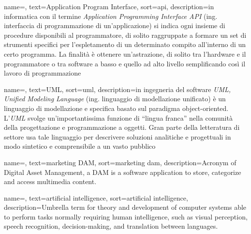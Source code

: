 
\renewcommand{\acronymname}{Acronimi e abbreviazioni}







{
    name=,
    text=Application Program Interface,
    sort=api,
    description={in informatica con il termine \emph{Application Programming Interface API} (ing. interfaccia di programmazione di un'applicazione) si indica ogni insieme di procedure disponibili al programmatore, di solito raggruppate a formare un set di strumenti specifici per l'espletamento di un determinato compito all'interno di un certo programma. La finalità è ottenere un'astrazione, di solito tra l'hardware e il programmatore o tra software a basso e quello ad alto livello semplificando così il lavoro di programmazione}
}

{
    name=,
    text=UML,
    sort=uml,
    description={in ingegneria del software \emph{UML, Unified Modeling Language} (ing. linguaggio di modellazione unificato) è un linguaggio di modellazione e specifica basato sul paradigma object-oriented. L'\emph{UML} svolge un'importantissima funzione di ``lingua franca'' nella comunità della progettazione e programmazione a oggetti. Gran parte della letteratura di settore usa tale linguaggio per descrivere soluzioni analitiche e progettuali in modo sintetico e comprensibile a un vasto pubblico}
}

{
	name=,
	text=marketing DAM,
	sort=marketing dam,
	description={Acronym of Digital Asset Management, a DAM is a software application to store, categorize and access multimedia content.}
}

{
	name=,
	text=artificial intelligence,
	sort=artificial intelligence,
	description={Umbrella term for theory and development of computer systems able to perform tasks normally requiring human intelligence, such as visual perception, speech recognition, decision-making, and translation between languages.}
}


